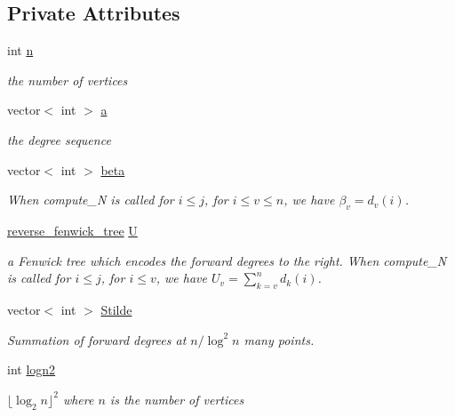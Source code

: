 \subsection*{Private Attributes}
\begin{DoxyCompactItemize}
\item 
int \hyperlink{classgraph__encoder_a7fedc9ace19e34abb32f1851c8597591}{n}
\begin{DoxyCompactList}\small\item\em the number of vertices \end{DoxyCompactList}\item 
vector$<$ int $>$ \hyperlink{classgraph__encoder_a56eb5cf480ae5c2fca9f3a45f2ffd4f1}{a}
\begin{DoxyCompactList}\small\item\em the degree sequence \end{DoxyCompactList}\item 
vector$<$ int $>$ \hyperlink{classgraph__encoder_a40880adecfd63fb86e94b4b0fc3f6bc2}{beta}
\begin{DoxyCompactList}\small\item\em When compute\+\_\+N is called for $i \leq j$, for $i \leq v \leq n$, we have $\beta_v = d_v(i)$. \end{DoxyCompactList}\item 
\hyperlink{classreverse__fenwick__tree}{reverse\+\_\+fenwick\+\_\+tree} \hyperlink{classgraph__encoder_a3314c40920f2ee132958a6b0ce7e7995}{U}
\begin{DoxyCompactList}\small\item\em a Fenwick tree which encodes the forward degrees to the right. When compute\+\_\+N is called for $i \leq j$, for $i \leq v$, we have $U_v = \sum_{k=v}^n d_k(i)$. \end{DoxyCompactList}\item 
vector$<$ int $>$ \hyperlink{classgraph__encoder_a342688a3fdee511b7fae3f155cfb10cf}{Stilde}
\begin{DoxyCompactList}\small\item\em Summation of forward degrees at $n / \log^2 n$ many points. \end{DoxyCompactList}\item 
int \hyperlink{classgraph__encoder_a27fde3a95a280304877b1e37fc4d8553}{logn2}
\begin{DoxyCompactList}\small\item\em $\lfloor \log_2 n \rfloor^2$ where $n$ is the number of vertices \end{DoxyCompactList}\end{DoxyCompactItemize}


